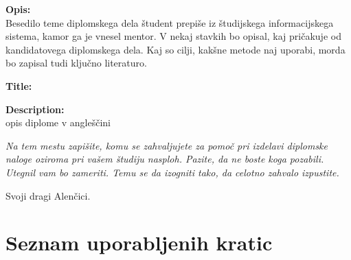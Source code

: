 \documentclass[a4paper,12pt,openright]{book}
\newcommand{\clearemptydoublepage}{\newpage{\pagestyle{empty}\cleardoublepage}}
\begin{document}
\bigskip
\noindent\textbf{Opis:}\\
Besedilo teme diplomskega dela študent prepiše iz študijskega informacijskega sistema, kamor ga je vnesel mentor. 
V nekaj stavkih bo opisal, kaj pričakuje od kandidatovega diplomskega dela. 
Kaj so cilji, kakšne metode naj uporabi, morda bo zapisal tudi ključno literaturo.

\bigskip
\noindent\textbf{Title:} 


\bigskip
\noindent\textbf{Description:}\\
opis diplome v angleščini

\vfill



\vspace{2cm}

\clearemptydoublepage

\thispagestyle{empty}\mbox{}\vfill\null\it%
\noindent
Na tem mestu zapišite, komu se zahvaljujete za pomoč pri izdelavi diplomske naloge oziroma pri vašem študiju nasploh. Pazite, da ne boste koga pozabili. Utegnil vam bo zameriti. Temu se da izogniti tako, da celotno zahvalo izpustite.
\rm\normalfont

\clearemptydoublepage

\thispagestyle{empty}\mbox{}{\textheight}\mbox{}\hfill\begin{minipage}{0.55\textwidth}%
Svoji dragi Alenčici.
\normalfont\end{minipage}

\clearemptydoublepage


\pagestyle{empty}
\def\thepage{}%
\tableofcontents{}


\clearemptydoublepage


\chapter*{Seznam uporabljenih kratic}
\end{document}
